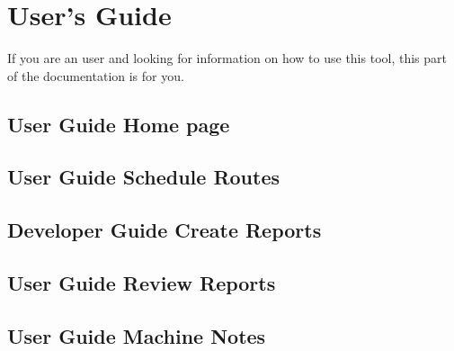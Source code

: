 \documentclass[letterpaper,10pt,english]{sphinxmanual}
\begin{document}
\chapter{User’s Guide}
\label{\detokenize{index:user-s-guide}}
If you are an user and looking for information on how to use this tool, this part of the documentation is for you.


\section{User Guide \sphinxhyphen{} Home page}
\label{\detokenize{home_u:user-guide-home-page}}\label{\detokenize{home_u::doc}}

\section{User Guide \sphinxhyphen{} Schedule Routes}
\label{\detokenize{schedule_routes_u:user-guide-schedule-routes}}\label{\detokenize{schedule_routes_u::doc}}

\section{Developer Guide \sphinxhyphen{} Create Reports}
\label{\detokenize{create_reports_u:developer-guide-create-reports}}\label{\detokenize{create_reports_u::doc}}

\section{User Guide \sphinxhyphen{} Review Reports}
\label{\detokenize{review_reports_u:user-guide-review-reports}}\label{\detokenize{review_reports_u::doc}}

\section{User Guide \sphinxhyphen{} Machine Notes}
\label{\detokenize{machine_notes_u:user-guide-machine-notes}}\label{\detokenize{machine_notes_u::doc}}


\renewcommand{\indexname}{Index}
\printindex
\end{document}
